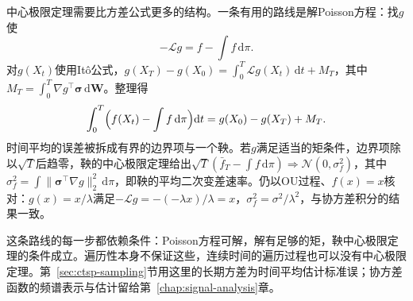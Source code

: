 中心极限定理需要比方差公式更多的结构。一条有用的路线是解Poisson方程：找$g$使
\begin{equation}
  -\mathcal Lg=f-\int f\,\mathrm d\pi .
  \label{eq:ctsp-poisson-equation}
\end{equation}
对$g(X_t)$使用Itô公式，$g(X_T)-g(X_0)=\int_0^T\mathcal Lg(X_t)\,\mathrm dt+M_T$，其中$M_T=\int_0^T\nabla g^\top\bm\sigma\,\mathrm d\bm W$。整理得
\[
  \int_0^T\Bigl(f(X_t)-\int f\,\mathrm d\pi\Bigr)\mathrm dt=g(X_0)-g(X_T)+M_T .
\]
时间平均的误差被拆成有界的边界项与一个鞅。若$g$满足适当的矩条件，边界项除以$\sqrt T$后趋零，鞅的中心极限定理给出$\sqrt T(\bar f_T-\int f\,\mathrm d\pi)\Rightarrow\mathcal N(0,\sigma_f^2)$，其中$\sigma_f^2=\int\|\bm\sigma^\top\nabla g\|_2^2\,\mathrm d\pi$，即鞅的平均二次变差速率。仍以OU过程、$f(x)=x$核对：$g(x)=x/\lambda$满足$-\mathcal Lg=-(-\lambda x)/\lambda=x$，$\sigma_f^2=\sigma^2/\lambda^2$，与协方差积分的结果一致。

这条路线的每一步都依赖条件：Poisson方程可解，解有足够的矩，鞅中心极限定理的条件成立。遍历性本身不保证这些，连续时间的遍历过程也可以没有中心极限定理。第~\ref{sec:ctsp-sampling}节用这里的长期方差为时间平均估计标准误；协方差函数的频谱表示与估计留给第~\ref{chap:signal-analysis}章。
